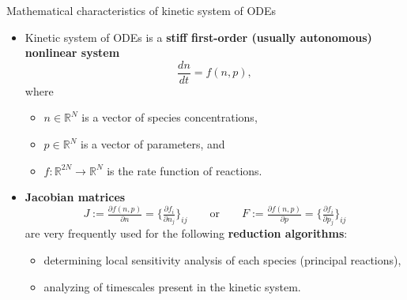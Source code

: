 %
%
\begin{frame}{Mathematical characteristics of kinetic system of ODEs}
	\begin{itemize}
		\item Kinetic system of ODEs is a {\bf stiff first-order (usually autonomous) nonlinear system}
		\[	\frac{d n}{dt} = f(n, p), \]
		where
		\begin{itemize}
			\item $n \in \mathbb{R}^{N}$ is a vector of species concentrations,
			\item $p \in \mathbb{R}^{N}$ is a vector of parameters, and
			\item $f: \mathbb{R}^{2N} \rightarrow \mathbb{R}^{N}$ is the rate function of reactions.
		\end{itemize}
		\item {\bf Jacobian matrices}
		\[
		\boxed{
			J := \tfrac{\partial f(n, p)}{\partial n} = \bigg\{  \tfrac{\partial f_i}{\partial n_j} \bigg\}_{ij} \qquad  \mbox{or} \qquad
			F := \tfrac{\partial f(n, p)}{\partial p} = \bigg\{  \tfrac{\partial f_i}{\partial p_j} \bigg\}_{ij}
		}
		\]
		are very frequently used for the following {\bf reduction algorithms}:
		\begin{itemize}
			\item determining local sensitivity analysis of each species (principal reactions),
			\item analyzing of timescales present in the kinetic system.
		\end{itemize}
	\end{itemize}
\end{frame}
%
%
